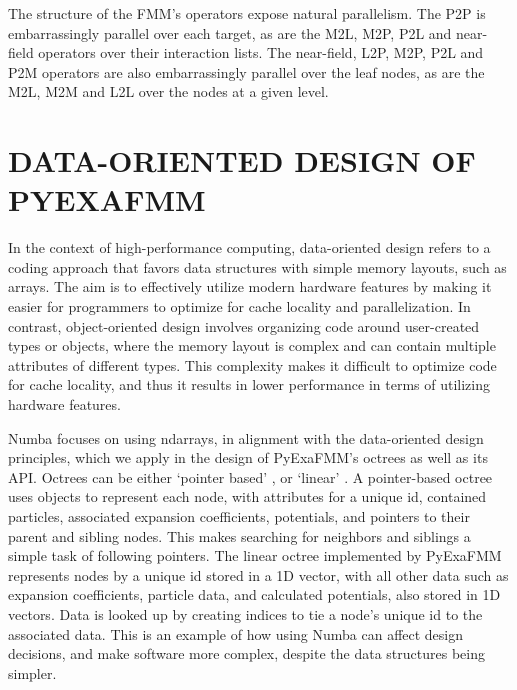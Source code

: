 \documentclass{IEEEcsmag}
\begin{document}
The structure of the FMM's operators expose natural parallelism. The P2P is embarrassingly parallel over each target, as are the M2L, M2P, P2L and near-field operators over their interaction lists. The near-field, L2P, M2P, P2L and P2M operators are also embarrassingly parallel over the leaf nodes, as are the M2L, M2M and L2L over the nodes at a given level.

\section{DATA-ORIENTED DESIGN OF PYEXAFMM}

In the context of high-performance computing, data-oriented design refers to a coding approach that favors data structures with simple memory layouts, such as arrays. The aim is to effectively utilize modern hardware features by making it easier for programmers to optimize for cache locality and parallelization.
In contrast, object-oriented design involves organizing code around user-created types or objects, where the memory layout is complex and can contain multiple attributes of different types. 
This complexity makes it difficult to optimize code for cache locality, and thus it results in lower performance in terms of utilizing hardware features.

Numba focuses on using ndarrays, in alignment with the data-oriented design principles, which we apply in the design of PyExaFMM's octrees as well as its API.
Octrees can be either `pointer based' \cite{Wang2021}, or `linear' \cite{Sundar2007}. A pointer-based octree uses objects to represent each node, with attributes for a unique id, contained particles, associated expansion coefficients, potentials, and pointers to their parent and sibling nodes. This makes searching for neighbors and siblings a simple task of following pointers. The linear octree implemented by PyExaFMM represents nodes by a unique id stored in a 1D vector, with all other data such as expansion coefficients, particle data, and calculated potentials, also stored in 1D vectors. Data is looked up by creating indices to tie a node's unique id to the associated data. This is an example of how using Numba can affect design decisions, and make software more complex, despite the data structures being simpler.
\end{document}
